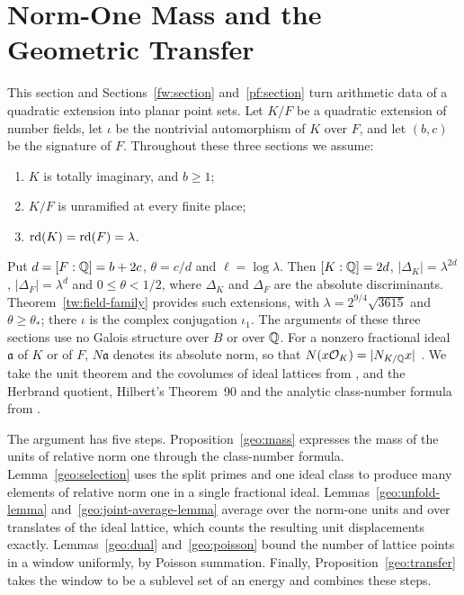 \section{Norm-One Mass and the Geometric Transfer}
\label{geo:section}

This section and Sections~\ref{fw:section} and~\ref{pf:section} turn
arithmetic data of a quadratic extension into planar point sets. Let $K/F$ be a quadratic extension of
number fields, let $\iota$ be the nontrivial automorphism of $K$ over
$F$, and let $(b,c)$ be the signature of $F$. Throughout these three
sections we assume:
\begin{enumerate}
\item[(G1)] $K$ is totally imaginary, and $b\ge1$;
\item[(G2)] $K/F$ is unramified at every finite place;
\item[(G3)] $\operatorname{rd}(K)=\operatorname{rd}(F)=\lambda$.
\end{enumerate}
Put $d=[F:\mathbb Q]=b+2c$, $\theta=c/d$ and $\ell=\log\lambda$. Then
$[K:\mathbb Q]=2d$, $|\Delta_K|=\lambda^{2d}$, $|\Delta_F|=\lambda^d$ and
$0\le\theta<1/2$, where $\Delta_K$ and $\Delta_F$ are the absolute
discriminants. Theorem~\ref{tw:field-family} provides such extensions,
with $\lambda=2^{9/4}\sqrt{3615}$ and $\theta\ge\theta_*$; there $\iota$
is the complex conjugation $\iota_1$. The arguments of these three
sections use no Galois structure over $B$ or over $\mathbb Q$. For a nonzero
fractional ideal $\mathfrak a$ of $K$ or of $F$, $N\mathfrak a$ denotes
its absolute norm, so that $N(x\mathcal O_K)=|N_{K/\mathbb Q}x|$
\cite[Propositions~4.1 and~4.2]{MilneANT}. We take the unit theorem and
the covolumes of ideal lattices from \cite{MilneANT}, and the Herbrand
quotient, Hilbert's Theorem~90 and the analytic class-number formula
from \cite{MilneCFT}.

The argument has five steps. Proposition~\ref{geo:mass} expresses the
mass of the units of relative norm one through the class-number
formula. Lemma~\ref{geo:selection} uses the split primes and one ideal
class to produce many elements of relative norm one in a single
fractional ideal. Lemmas~\ref{geo:unfold-lemma}
and~\ref{geo:joint-average-lemma} average over the norm-one units and
over translates of the ideal lattice, which counts the resulting unit
displacements exactly. Lemmas~\ref{geo:dual} and~\ref{geo:poisson} bound
the number of lattice points in a window uniformly, by Poisson
summation. Finally, Proposition~\ref{geo:transfer} takes the window to
be a sublevel set of an energy and combines these steps.

